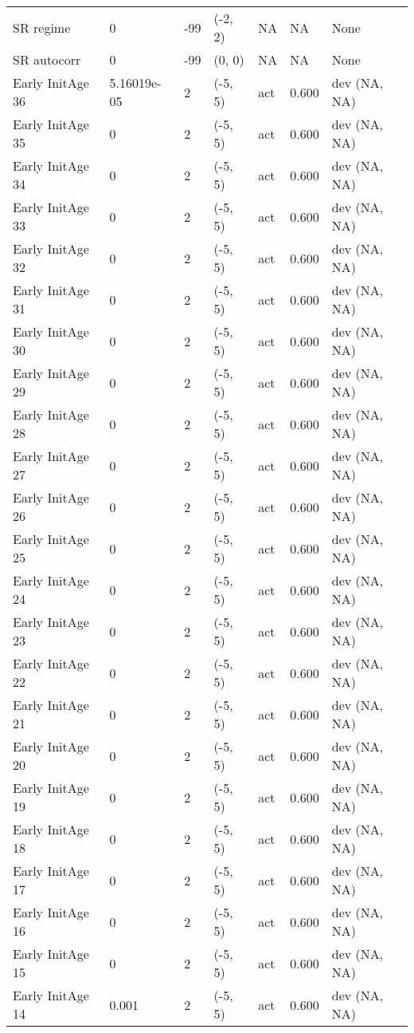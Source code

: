 \documentclass[11pt,
  english,
  letterpaper,
]{article}
\begin{document}
\begin{landscape}
\begin{longtable}[t]{>{\raggedright\arraybackslash}p{7.5cm}lllll>{\raggedright\arraybackslash}p{3.5cm}}
SR regime & 0 & -99 & (-2, 2) & NA & NA & None\\
SR autocorr & 0 & -99 & (0, 0) & NA & NA & None\\
Early InitAge 36 & 5.16019e-05 & 2 & (-5, 5) & act & 0.600 & dev (NA, NA)\\
Early InitAge 35 & 0 & 2 & (-5, 5) & act & 0.600 & dev (NA, NA)\\
Early InitAge 34 & 0 & 2 & (-5, 5) & act & 0.600 & dev (NA, NA)\\
Early InitAge 33 & 0 & 2 & (-5, 5) & act & 0.600 & dev (NA, NA)\\
Early InitAge 32 & 0 & 2 & (-5, 5) & act & 0.600 & dev (NA, NA)\\
Early InitAge 31 & 0 & 2 & (-5, 5) & act & 0.600 & dev (NA, NA)\\
Early InitAge 30 & 0 & 2 & (-5, 5) & act & 0.600 & dev (NA, NA)\\
Early InitAge 29 & 0 & 2 & (-5, 5) & act & 0.600 & dev (NA, NA)\\
Early InitAge 28 & 0 & 2 & (-5, 5) & act & 0.600 & dev (NA, NA)\\
Early InitAge 27 & 0 & 2 & (-5, 5) & act & 0.600 & dev (NA, NA)\\
Early InitAge 26 & 0 & 2 & (-5, 5) & act & 0.600 & dev (NA, NA)\\
Early InitAge 25 & 0 & 2 & (-5, 5) & act & 0.600 & dev (NA, NA)\\
Early InitAge 24 & 0 & 2 & (-5, 5) & act & 0.600 & dev (NA, NA)\\
Early InitAge 23 & 0 & 2 & (-5, 5) & act & 0.600 & dev (NA, NA)\\
Early InitAge 22 & 0 & 2 & (-5, 5) & act & 0.600 & dev (NA, NA)\\
Early InitAge 21 & 0 & 2 & (-5, 5) & act & 0.600 & dev (NA, NA)\\
Early InitAge 20 & 0 & 2 & (-5, 5) & act & 0.600 & dev (NA, NA)\\
Early InitAge 19 & 0 & 2 & (-5, 5) & act & 0.600 & dev (NA, NA)\\
Early InitAge 18 & 0 & 2 & (-5, 5) & act & 0.600 & dev (NA, NA)\\
Early InitAge 17 & 0 & 2 & (-5, 5) & act & 0.600 & dev (NA, NA)\\
Early InitAge 16 & 0 & 2 & (-5, 5) & act & 0.600 & dev (NA, NA)\\
Early InitAge 15 & 0 & 2 & (-5, 5) & act & 0.600 & dev (NA, NA)\\
Early InitAge 14 & 0.001 & 2 & (-5, 5) & act & 0.600 & dev (NA, NA)\\

\end{longtable}
\end{landscape}
\end{document}
